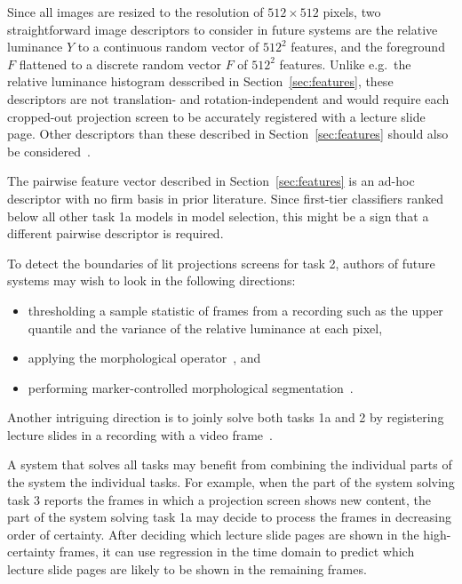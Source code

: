 Since all images are resized to the resolution of $512\times 512$ pixels, two
straightforward image descriptors to consider in future systems are the
relative luminance $Y$  to a continuous random vector of
$512^2$ features, and the foreground $F$ flattened to a discrete random vector
$F$ of $512^2$ features. Unlike e.g.\ the relative luminance histogram
desscribed in Section~\ref{sec:features}, these descriptors are not
translation- and rotation-independent and would require each cropped-out
projection screen to be accurately registered with a lecture slide page. Other
descriptors than these described in Section~\ref{sec:features} should also be
considered~\cite{pass1999comparing}.

The pairwise feature vector described in Section~\ref{sec:features} is an
ad-hoc descriptor with no firm basis in prior literature. Since first-tier
classifiers ranked below all other task 1a models in model selection, this
might be a sign that a different pairwise descriptor is required.

To detect the boundaries of lit projections screens for task 2, authors of
future systems may wish to look in the following directions:
\begin{itemize}
  \item thresholding a sample statistic of frames from a recording such
    as the upper quantile and the variance of the relative luminance at each pixel,
  \item applying the  morphological
    operator~\cite[sec.~6.3.4]{soille2013morphological}, and
  \item performing marker-controlled morphological
    segmentation~\cite[sec.~9.3]{soille2013morphological}.
\end{itemize}
Another intriguing direction is to joinly solve both tasks 1a and 2 by
registering lecture slides in a recording with a video
frame~\cite{wolberg2000robust,zokai2004robust,matas2004robust}.

A system that solves all tasks may benefit from combining the individual parts
of the system the individual tasks. For example, when the part of the system
solving task 3 reports the frames in which a projection screen shows new
content, the part of the system solving task 1a may decide to process the
frames in decreasing order of certainty. After deciding which lecture slide
pages are shown in the high-certainty frames, it can use regression in the time
domain to predict which lecture slide pages are likely to be shown in the
remaining frames.

